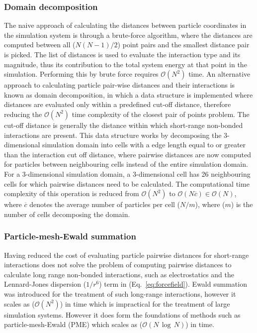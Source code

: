 \subsubsection{Domain decomposition}
The naive approach of calculating the distances between particle coordinates in the simulation system is through a brute-force algorithm, where the distances are computed between all ($N(N-1)/2$) point pairs and the smallest distance pair is picked. The list of distances is used to evaluate the interaction type and its magnitude, thus its contribution to the total system energy at that point in the simulation. Performing this by brute force requires $\mathcal{O} (N^2)$ time. An alternative approach to calculating particle pair-wise distances and their interactions is known as domain decomposition, in which a data structure is implemented where distances are evaluated only within a predefined cut-off distance, therefore reducing the $\mathcal{O} (N^2)$ time complexity of the closest pair of points problem. The cut-off distance is generally the distance within which short-range non-bonded interactions are present. This data structure works by decomposing the 3-dimensional simulation domain into cells with a edge length equal to or greater than the interaction cut off distance, where pairwise distances are now computed for particles between neighbouring cells instead of the entire simulation domain. For a 3-dimensional simulation domain, a 3-dimensional cell has 26 neighbouring cells for which pairwise distances need to be calculated. The computational time complexity of this operation is reduced from $\mathcal{O} (N^2)$ to $\mathcal{O} (N\overline{c}) \in \mathcal{O} (N)$, where $\overline{c}$ denotes the average number of particles per cell ($N/m$), where ($m$) is the number of cells decomposing the domain.  
\subsubsection{Particle-mesh-Ewald summation}
Having reduced the cost of evaluating particle pairwise distances for short-range interactions does not solve the problem of computing pairwise distances to calculate long range non-bonded interactions, such as electrostatics and the Lennard-Jones dispersion ($1/r^6$) term in (Eq.~\ref{eq:forcefield}). Ewald summation \cite{ewald1921berechnung} was introduced for the treatment of such long-range interactions, however it scales as ($\mathcal{O}(N^2)$) in time which is impractical for the treatment of large simulation systems. However it does form the foundations of methods such as particle-mesh-Ewald (PME) \cite{Darden1993} which scales as ($\mathcal{O}(N\,\log\,N)$) in time.

